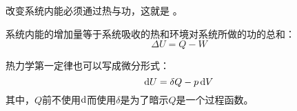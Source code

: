             改变系统内能必须通过热与功，这就是 。

            \begin{law}
                系统内能的增加量等于系统吸收的热和环境对系统所做的功的总和：
                \begin{equation}
                    \Delta U = Q - W
                    \nonumber
                \end{equation}
            \end{law}
            热力学第一定律也可以写成微分形式：
            \begin{equation}
                \dif{U} = \delta{Q} - p\dif{V}
                \nonumber
            \end{equation}
            其中，$Q$前不使用$\dif$而使用$\delta$是为了暗示$Q$是一个过程函数。
